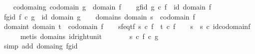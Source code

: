 \begin{isabellebody}
\ \ \isamarkupfalse%
\ codomain{\isacharunderscore}{\kern0pt}g{\isacharcolon}{\kern0pt}\ {\isachardoublequoteopen}codomain\ g\ {\isacharequal}{\kern0pt}\ domain\ f{\isachardoublequoteclose}\isanewline
\ \ \isamarkupfalse%
\ gf{\isacharunderscore}{\kern0pt}id{\isacharcolon}{\kern0pt}\ {\isachardoublequoteopen}g\ {\isasymcirc}\isactrlsub c\ f\ {\isacharequal}{\kern0pt}\ id\ {\isacharparenleft}{\kern0pt}domain\ f{\isacharparenright}{\kern0pt}{\isachardoublequoteclose}\isanewline
\ \ \isamarkupfalse%
\ fg{\isacharunderscore}{\kern0pt}id{\isacharcolon}{\kern0pt}\ {\isachardoublequoteopen}f\ {\isasymcirc}\isactrlsub c\ g\ {\isacharequal}{\kern0pt}\ id\ {\isacharparenleft}{\kern0pt}domain\ g{\isacharparenright}{\kern0pt}{\isachardoublequoteclose}\isanewline
\ \ \isamarkupfalse%
\ domain{\isacharunderscore}{\kern0pt}s{\isacharcolon}{\kern0pt}\ {\isachardoublequoteopen}domain\ s\ {\isacharequal}{\kern0pt}\ codomain\ f{\isachardoublequoteclose}\isanewline
\ \ \isamarkupfalse%
\ domain{\isacharunderscore}{\kern0pt}t{\isacharcolon}{\kern0pt}\ {\isachardoublequoteopen}domain\ t\ {\isacharequal}{\kern0pt}\ codomain\ f{\isachardoublequoteclose}\isanewline
\ \ \isamarkupfalse%
\ sf{\isacharunderscore}{\kern0pt}eq{\isacharunderscore}{\kern0pt}tf{\isacharcolon}{\kern0pt}\ {\isachardoublequoteopen}s\ {\isasymcirc}\isactrlsub c\ f\ {\isacharequal}{\kern0pt}\ t\ {\isasymcirc}\isactrlsub c\ f{\isachardoublequoteclose}\isanewline
\isanewline
\ \ \isamarkupfalse%
\ {\isachardoublequoteopen}s\ {\isacharequal}{\kern0pt}\ s\ {\isasymcirc}\isactrlsub c\ id{\isacharparenleft}{\kern0pt}codomain{\isacharparenleft}{\kern0pt}f{\isacharparenright}{\kern0pt}{\isacharparenright}{\kern0pt}{\isachardoublequoteclose}\isanewline
\ \ \ \ \isamarkupfalse%
\ {\isacharparenleft}{\kern0pt}metis\ domain{\isacharunderscore}{\kern0pt}s\ id{\isacharunderscore}{\kern0pt}right{\isacharunderscore}{\kern0pt}unit{\isacharparenright}{\kern0pt}\isanewline
\ \ \isamarkupfalse%
\ \isamarkupfalse%
\ {\isachardoublequoteopen}{\isachardot}{\kern0pt}{\isachardot}{\kern0pt}{\isachardot}{\kern0pt}\ {\isacharequal}{\kern0pt}\ s\ {\isasymcirc}\isactrlsub c\ {\isacharparenleft}{\kern0pt}f\ {\isasymcirc}\isactrlsub c\ g{\isacharparenright}{\kern0pt}{\isachardoublequoteclose}\isanewline
\ \ \ \ \isamarkupfalse%
\ {\isacharparenleft}{\kern0pt}simp\ add{\isacharcolon}{\kern0pt}\ domain{\isacharunderscore}{\kern0pt}g\ fg{\isacharunderscore}{\kern0pt}id{\isacharparenright}{\kern0pt}\isanewline

\end{isabellebody}
